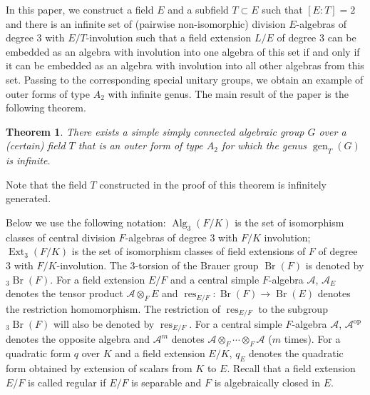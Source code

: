 \documentclass[10pt]{article}
\newtheorem{theorem}{Theorem}[section]
\theoremstyle{definition}
\DeclareMathOperator{\Br}{Br}
\DeclareMathOperator{\res}{res}
\DeclareMathOperator{\Alg}{Alg}
\DeclareMathOperator{\Ext}{Ext}
\DeclareMathOperator{\gen}{gen}
\newcommand{\A}{\mathcal A}
\newcommand{\bthree}[1]{{}_3\Br(#1)}
\newcommand{\sourcepage}[1]{\label{source-page-#1}}
\begin{document}
In this paper, we construct a field $E$ and a subfield $T\subset E$ such that $[E:T]=2$ and there is an infinite set of (pairwise non-isomorphic) division $E$-algebras of degree $3$ with $E/T$-involution such that a field extension $L/E$ of degree $3$ can be embedded as an algebra with involution into one algebra of this set if and only if it can be embedded as an algebra with involution into all other algebras from this set. Passing to the corresponding special unitary groups, we obtain an example of outer forms of type $A_2$ with infinite genus. The main result of the paper is the following theorem.
\begin{theorem}\label{thm-main}
There exists a simple simply connected algebraic group $G$ over a (certain) field $T$ that is an outer form of type $A_2$ for which the genus $\gen_T(G)$ is infinite.
\end{theorem}
Note that the field $T$ constructed in the proof of this theorem is infinitely generated.

Below we use the following notation: $\Alg_3(F/K)$ is the set of isomorphism classes of central division $F$-algebras of degree $3$ with $F/K$ involution; $\Ext_3(F/K)$ is the set of isomorphism classes of field extensions of $F$ of degree $3$ with $F/K$-involution. The $3$-torsion of the Brauer group $\Br(F)$ is denoted by $\bthree F$. For a field extension $E/F$ and a central simple $F$-algebra $\A$, $\A_E$ denotes the tensor product $\A\otimes_F E$ and $\res_{E/F}:\Br(F)\to\Br(E)$ denotes the restriction homomorphism. The restriction of $\res_{E/F}$ to the subgroup $\bthree F$ will also be denoted by $\res_{E/F}$. For a central simple $F$-algebra $\A$, $\A^{\mathrm{op}}$ denotes the opposite algebra and $\A^m$ denotes $\A\otimes_F\cdots\otimes_F\A$ ($m$ times). For a quadratic form $q$ over $K$ and a field extension $E/K$, $q_E$ denotes the quadratic form obtained by extension of scalars from $K$ to $E$. Recall that a field extension $E/F$ is called regular if $E/F$ is separable and $F$ is algebraically closed in $E$.
\newpage
\sourcepage{3}
\end{document}
